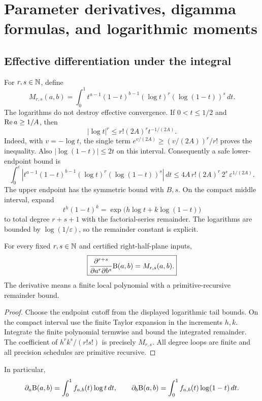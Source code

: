 \section{Parameter derivatives, digamma formulas, and logarithmic moments}
\label{sec:derivatives}

\subsection{Effective differentiation under the integral}

For $r,s\in\mathbb N$, define
\[
 M_{r,s}(a,b)=\int_0^1
 t^{a-1}(1-t)^{b-1}
 (\log t)^r(\log(1-t))^s\,dt.
\]
The logarithms do not destroy effective convergence.  If $0<t\le1/2$ and $\operatorname{Re} a\ge1/A$, then
\[
 |\log t|^r\le r!(2A)^r t^{-1/(2A)}.
\]
Indeed, with $v=-\log t$, the single term
$e^{v/(2A)}\ge(v/(2A))^r/r!$ proves the inequality.  Also
$|\log(1-t)|\le2t$ on this interval.  Consequently a safe lower-endpoint bound is
\[
 \int_0^\varepsilon
 |t^{a-1}(1-t)^{b-1}
  (\log t)^r(\log(1-t))^s|\,dt
 \le
 4A\,r!(2A)^r\,2^s\,
 \varepsilon^{1/(2A)}.
\]
The upper endpoint has the symmetric bound with $B,s$.  On the compact middle interval, expand
\[
 t^h(1-t)^k
 =\exp\bigl(h\log t+k\log(1-t)\bigr)
\]
to total degree $r+s+1$ with the factorial-series remainder.  The logarithms are bounded by $\log(1/\varepsilon)$, so the remainder constant is explicit.

\begin{theorem}\label{thm:mixed-derivatives}
For every fixed $r,s\in\mathbb N$ and certified right-half-plane inputs,
\[
 \boxed{
 \frac{\partial^{r+s}}{\partial a^r\partial b^s}\mathrm B(a,b)
 =M_{r,s}(a,b).}
\]
The derivative means a finite local polynomial with a primitive-recursive remainder bound.
\end{theorem}

\begin{proof}
Choose the endpoint cutoff from the displayed logarithmic tail bounds.  On the compact interval use the finite Taylor expansion in the increments $h,k$.  Integrate the finite polynomial termwise and bound the integrated remainder.  The coefficient of $h^rk^s/(r!s!)$ is precisely $M_{r,s}$.  All degree loops are finite and all precision schedules are primitive recursive.
\end{proof}

In particular,
\[
 \partial_a\mathrm B(a,b)=\int_0^1f_{a,b}(t)\log t\,dt,
 \qquad
 \partial_b\mathrm B(a,b)=\int_0^1f_{a,b}(t)\log(1-t)\,dt.
\]

